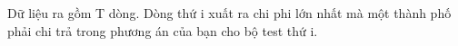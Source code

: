 Dữ liệu ra gồm T dòng. Dòng thứ i xuất ra chi phi lớn nhất mà một thành phố phải chi trả trong phương án của bạn cho bộ test thứ i.